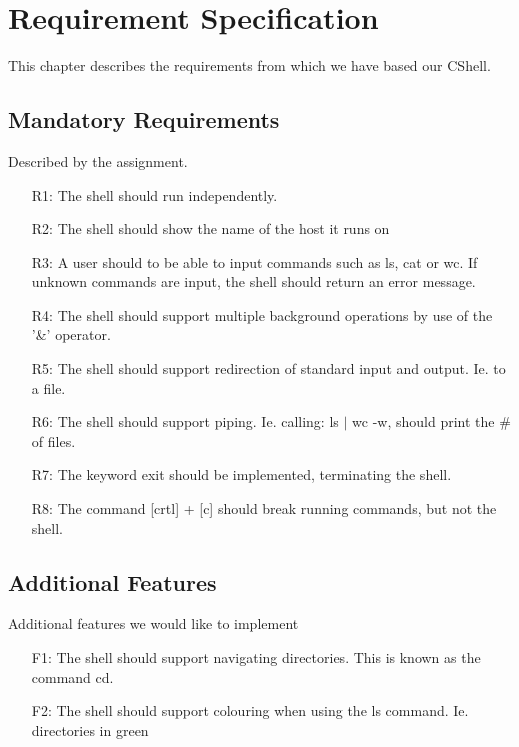\chapter{Requirement Specification}
This chapter describes the requirements from which we have based our CShell.

\section{Mandatory Requirements}
Described by the assignment.

\begin{itemize}[leftmargin=25mm]

\item[R1:] The shell should run independently.
\item[R2:] The shell should show the name of the host it runs on
\item[R3:] A user should to be able to input commands such as ls, cat or wc. If unknown commands are input, the shell should return an error message.
\item[R4:] The shell should support multiple background operations by use of the '\&' operator.
\item[R5:] The shell should support redirection of standard input and output. Ie. to a file.
\item[R6:] The shell should support piping.
Ie. calling: ls $|$ wc -w, should print the \# of files.
\item[R7:] The keyword exit should be implemented, terminating the shell.
\item[R8:] The command [crtl] + [c] should break running commands, but not the shell.

\end{itemize}

\section{Additional Features}
Additional features we would like to implement

\begin{itemize}[leftmargin=25mm]

\item[F1:] The shell should support navigating directories. This is known as the command cd.
\item[F2:] The shell should support colouring when using the ls command. Ie. directories in green

\end{itemize}